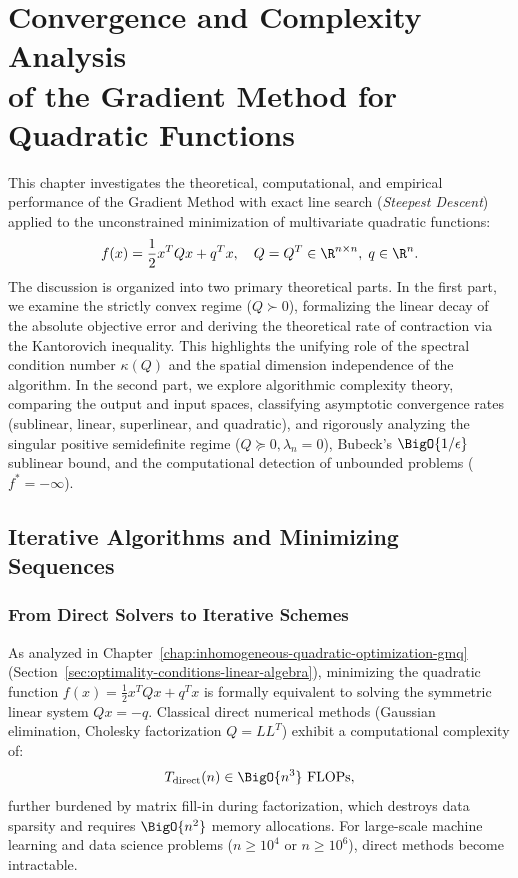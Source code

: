\chapter[Convergence and Complexity Analysis of the Gradient Method]{Convergence and Complexity Analysis\\of the Gradient Method for Quadratic Functions}
\label{chap:convergence-complexity-gradient-method-quadratics}

This chapter investigates the theoretical, computational, and empirical performance of the Gradient Method with exact line search (\textit{Steepest Descent}) applied to the unconstrained minimization of multivariate quadratic functions:
\begin{equation}
    f(x) = \frac{1}{2} x^T Q x + q^T x, \quad Q = Q^T \in \R^{n \times n}, \; q \in \R^n.
\end{equation}
The discussion is organized into two primary theoretical parts. In the first part, we examine the strictly convex regime ($Q \succ 0$), formalizing the linear decay of the absolute objective error and deriving the theoretical rate of contraction via the Kantorovich inequality. This highlights the unifying role of the spectral condition number $\kappa(Q)$ and the spatial dimension independence of the algorithm. In the second part, we explore algorithmic complexity theory, comparing the output and input spaces, classifying asymptotic convergence rates (sublinear, linear, superlinear, and quadratic), and rigorously analyzing the singular positive semidefinite regime ($Q \succeq 0, \lambda_n = 0$), Bubeck's $\BigO{1/\epsilon}$ sublinear bound, and the computational detection of unbounded problems ($f^* = -\infty$).

\FloatBarrier
\section{Iterative Algorithms and Minimizing Sequences}
\label{sec:iterative-algorithms-minimizing-sequences}

\subsection{From Direct Solvers to Iterative Schemes}
As analyzed in Chapter~\ref{chap:inhomogeneous-quadratic-optimization-gmq} (Section~\ref{sec:optimality-conditions-linear-algebra}), minimizing the quadratic function $f(x) = \frac{1}{2} x^T Q x + q^T x$ is formally equivalent to solving the symmetric linear system $Q x = -q$. Classical direct numerical methods (Gaussian elimination, Cholesky factorization $Q = L L^T$) exhibit a computational complexity of:
\begin{equation}
    T_{\text{direct}}(n) \in \BigO{n^3} \text{ FLOPs},
\end{equation}
further burdened by matrix fill-in during factorization, which destroys data sparsity and requires $\BigO{n^2}$ memory allocations. For large-scale machine learning and data science problems ($n \ge 10^4$ or $n \ge 10^6$), direct methods become intractable.

